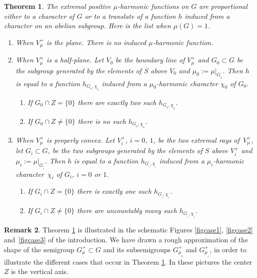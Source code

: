\documentclass[11pt]{article}
\numberwithin{equation}{section}
\newtheorem{Thm}{Theorem}[section]
\theoremstyle{definition}
\newtheorem{Rem}[Thm]{Remark}
\begin{document}
\begin{Thm}
\label{thconclu}
The extremal positive $\mu$-harmonic functions on $G$ are
proportional either to a character
of $G$ or to a translate of a function $h$ induced from a character on an abelian subgroup.
Here is the list when $\mu(G)\!=\!1$.

\begin{enumerate}
\item\label{thconclu1}
\emph{When $V^+_\mu$ is the plane}. There is no induced $\mu$-harmonic function.

\item\label{thconclu2}
\emph{When $V^+_\mu$ is a half-plane}. Let $V_0$ be the boundary line of $V^+_\mu$
and $G_0\subset G$ be the subgroup
generated by the
elements of $S$ above $V_0$ and $\mu_0:=\mu|_{G_{_0}}$.
Then $h$ is equal to a function $h_{G_{_0},\chi_{_0}}$ induced from a $\mu_0$-harmonic character $\chi_0$ of $G_0$.
\begin{enumerate}
\item\label{thconclu2a}
If $G_0\cap Z = \{ 0\}$
there are exactly two such $h_{G_{_0},\chi_{_0}}$.

\item\label{thconclu2b}
If $G_0\cap Z\neq \{ 0\}$ there is no such $h_{G_{_0},\chi_{_0}}$.
\end{enumerate}

\item\label{thconclu3}
\emph{When $V^+_\mu$ is properly convex}. Let $V^+_i$, $i=0$, $1$, be the two
extremal rays of~$V^+_\mu$, let $G_i\subset G$,
be the two subgroups generated by the
elements of $S$ above $V^+_i$ and $\mu_i:=\mu|_{G_{_i}}$.
Then $h$ is equal to a function $h_{G_{_i},\chi_{_i}}$ induced from a $\mu_i$-harmonic character~$\chi_i$ of $G_i$, $i=0$ or $1$.
\begin{enumerate}
\item\label{thconclu3a}
If $G_i\cap Z = \{ 0\}$
there is exactly one such $h_{G_{_i},\chi_{_i}}$.

\item\label{thconclu3b}
If $G_i\cap Z\neq \{ 0\}$
there are uncountably many such $h_{G_{_i},\chi_{_i}}$.
\end{enumerate}
\end{enumerate}
\end{Thm}

\begin{Rem}
Theorem \ref{thconclu} is illustrated in the schematic Figures \ref{figcase1}, \ref{figcase2} and~\ref{figcase3} of the introduction. We have drawn a rough approximation
of the shape of the semigroup $G^+_\mu\subset G$
and its subsemigroups $G^+_{\mu_{_0}}$ and $G^+_{\mu_{_1}}$,
in order to illustrate the different cases that occur in Theorem \ref{thconclu}.
In these pictures the center $Z$ is the vertical axis.
\end{Rem}
\end{document}
